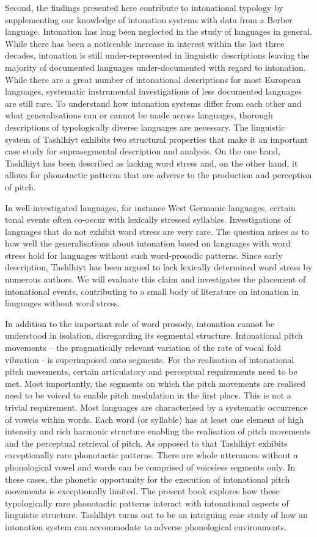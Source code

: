 Second, the findings presented here contribute to intonational typology by supplementing our knowledge of intonation systems with data from a Berber language. Intonation has long been neglected in the study of languages in general. While there has been a noticeable increase in interest within the last three decades, intonation is still under-represented in linguistic descriptions leaving the majority of documented languages under-documented with regard to intonation. While there are a great number of intonational descriptions for most European languages, systematic instrumental investigations of less documented languages are still rare. To understand how intonation systems differ from each other and what generalisations can or cannot be made across languages, thorough descriptions of typologically diverse languages are necessary. The linguistic system of Tashlhiyt exhibits two structural properties that make it an important case study for suprasegmental description and analysis. On the one hand, Tashlhiyt has been described as lacking word stress and, on the other hand, it allows for phonotactic patterns that are adverse to the production and perception of pitch. 

In well-investigated languages, for instance West Germanic languages, certain tonal events often co-occur with lexically stressed syllables. Investigations of languages that do not exhibit word stress are very rare. The question arises as to how well the generalisations about intonation based on languages with word stress hold for languages without such word-prosodic patterns. Since early description, Tashlhiyt has been argued to lack lexically determined word stress by numerous authors. We will evaluate this claim and investigates the placement of intonational events, contributing to a small body of literature on intonation in languages without word stress.

In addition to the important role of word prosody, intonation cannot be understood in isolation, disregarding its segmental structure. Intonational pitch movements – the pragmatically relevant variation of the rate of vocal fold vibration - is superimposed onto segments. For the realisation of intonational pitch movements, certain articulatory and perceptual requirements need to be met. Most importantly, the segments on which the pitch movements are realised need to be voiced to enable pitch modulation in the first place. This is not a trivial requirement. Most languages are characterised by a systematic occurrence of vowels within words. Each word (or syllable) has at least one element of high intensity and rich harmonic structure enabling the realisation of pitch movements and the perceptual retrieval of pitch. As opposed to that Tashlhiyt exhibits exceptionally rare phonotactic patterns. There are whole utterances without a phonological vowel and words can be comprised of voiceless segments only. In these cases, the phonetic opportunity for the execution of intonational pitch movements is exceptionally limited. The present book explores how these typologically rare phonotactic patterns interact with intonational aspects of linguistic structure. Tashlhiyt turns out to be an intriguing case study of how an intonation system can accommodate to adverse phonological environments.

